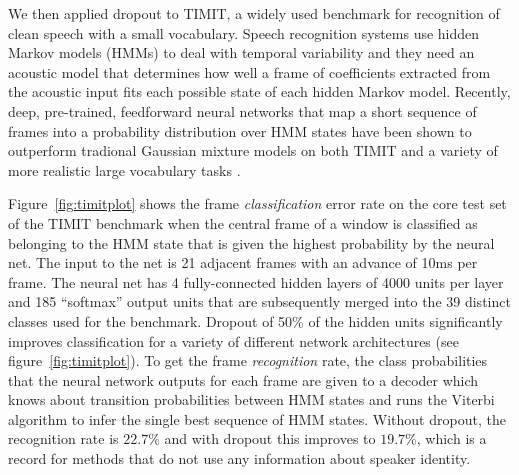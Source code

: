 \documentclass[12pt]{article}
\begin{document}
We then applied dropout to TIMIT, a widely used benchmark for recognition of clean speech
with a small vocabulary. Speech recognition systems use hidden Markov models (HMMs) to
deal with temporal variability and they need an acoustic model that determines how well a
frame of coefficients extracted from the acoustic input fits each possible state of each
hidden Markov model. Recently, deep, pre-trained, feedforward neural networks that map a
short sequence of frames into a probability distribution over HMM states have been shown
to outperform tradional Gaussian mixture models on both TIMIT \cite{MohamedIEEE} and a
variety of more realistic large vocabulary tasks \cite{DahlIEEE,JaitlyTR}.

Figure~\ref{fig:timitplot} shows the frame {\it classification} error rate on the core test set of the
TIMIT benchmark when the central frame of a window is classified as belonging to the HMM
state that is given the highest probability by the neural net.  The input to the net is
21 adjacent frames with an advance of 10ms per frame. The neural net has 4 fully-connected
hidden layers of 4000 units per layer and 185 ``softmax'' output units that are subsequently
merged into the 39 distinct classes used for the benchmark. Dropout of 50\% of the hidden
units significantly improves classification for a variety of different network
architectures (see figure~\ref{fig:timitplot}).  To get the frame {\it recognition} rate, the class
probabilities that the neural network outputs for each frame are given to a decoder which
knows about transition probabilities between HMM states and runs the Viterbi algorithm to
infer the single best sequence of HMM states. Without dropout, the recognition rate is
$22.7$\% and with dropout this improves to $19.7$\%, which is a record for methods that do not use
any information about speaker identity.
\end{document}
